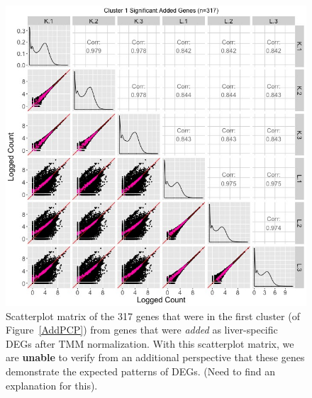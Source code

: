\documentclass{article}
\begin{document}
\null
\begin{figure}[t!]
\centerline{\includegraphics[width=1\columnwidth]{../MakeFigures/lkClustersAddSM.jpg}}
\caption{Scatterplot matrix of the 317 genes that were in the first cluster (of Figure~\ref{AddPCP}) from genes that were \textit{added} as liver-specific DEGs after TMM normalization. With this scatterplot matrix, we are \textbf{unable} to verify from an additional perspective that these genes demonstrate the expected patterns of DEGs. (Need to find an explanation for this).
\label{lkClustersAddSM}}
\end{figure}
\end{document}
